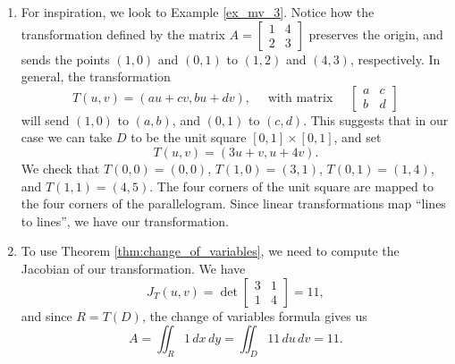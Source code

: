 {
\begin{enumerate}
\item For inspiration, we look to Example \ref{ex_mv_3}. Notice how the transformation defined by the matrix $A=\begin{bmatrix}
1&4\\2&3\end{bmatrix}$ preserves the origin, and sends the points $(1,0)$ and $(0,1)$ to $(1,2)$ and $(4,3)$, respectively. In general, the transformation
\[
T(u,v) = (au+cv,bu+dv), \quad\text{ with matrix } \quad \begin{bmatrix}
a&c\\b&d\end{bmatrix}
\]
will send $(1,0)$ to $(a,b)$, and $(0,1)$ to $(c,d)$. This suggests that in our case we can take $D$ to be the unit square $[0,1]\times [0,1]$, and set
\[
T(u,v) = (3u+v,u+4v).
\]
We check that $T(0,0)=(0,0)$, $T(1,0)=(3,1)$, $T(0,1)=(1,4)$, and $T(1,1)=(4,5)$. The four corners of the unit square are mapped to the four corners of the parallelogram. Since linear transformations map ``lines to lines'', we have our transformation.

\item To use Theorem \ref{thm:change_of_variables}, we need to compute the Jacobian of our transformation. We have
\[
J_T(u,v) = \det\begin{bmatrix}3&1\\1&4\end{bmatrix} = 11,
\]
and since $R=T(D)$, the change of variables formula gives us
\[
A = \iint_R 1 \,dx\,dy = \iint_D 11\,du\,dv = 11.
\]
\end{enumerate}
}\\

